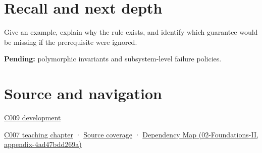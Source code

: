 \section{Recall and next depth}\label{appendix-8e5214819615-recall-and-next-depth}

Give an example, explain why the rule exists, and identify which guarantee would be missing if the prerequisite were ignored.

\textbf{Pending:} polymorphic invariants and subsystem-level failure policies.

\section{Source and navigation}\label{appendix-8e5214819615-source-and-navigation}

\hyperref[appendix-fd090d982a15-m009---parts-127-147]{C009 development}

\href{Continuous\%20Notes/Computing\%20Foundations\%20-\%20From\%20Bits\%20to\%20C++\%20and\%20Systems\%20APIs\#Public\%20records\%20and\%20protected\%20invariants}{C007 teaching chapter} · \hyperref[appendix-fd090d982a15-m007---parts-101-112]{Source coverage} · \href{../02-Foundations-II/main.pdf\#nameddest=appendix-4ad47bdd269a}{Dependency Map (02-Foundations-II, appendix-4ad47bdd269a)}
